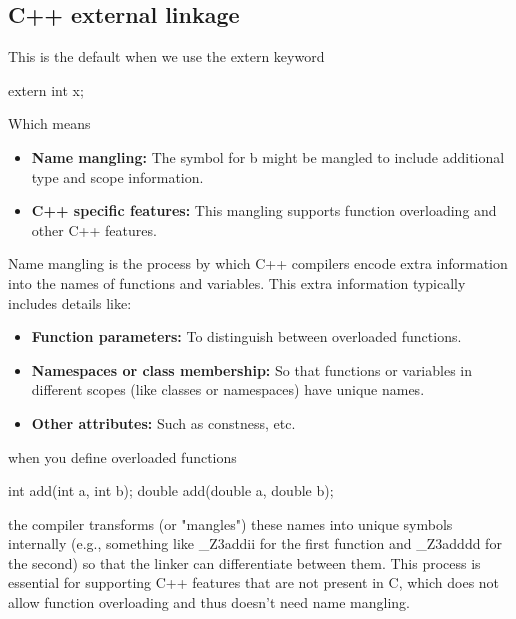 \documentclass{report}
\begin{document}
\pagebreak 
{}
\bigbreak \noindent 
\subsection{C++ external linkage}
\bigbreak \noindent 
This is the default when we use the extern keyword
\bigbreak \noindent 
\begin{cppcode}
extern int x;
\end{cppcode}
\bigbreak \noindent 
Which means
\begin{itemize}
    \item \textbf{Name mangling:} The symbol for b might be mangled to include additional type and scope information.
    \item \textbf{C++ specific features:} This mangling supports function overloading and other C++ features.
\end{itemize}
\bigbreak \noindent 
Name mangling is the process by which C++ compilers encode extra information into the names of functions and variables. This extra information typically includes details like:
\begin{itemize}
    \item \textbf{Function parameters:} To distinguish between overloaded functions.
    \item \textbf{Namespaces or class membership:} So that functions or variables in different scopes (like classes or namespaces) have unique names.
    \item \textbf{Other attributes:} Such as constness, etc.
\end{itemize}
\bigbreak \noindent 
when you define overloaded functions
\bigbreak \noindent 
\begin{cppcode}
int add(int a, int b);
double add(double a, double b);
\end{cppcode}
\bigbreak \noindent 
the compiler transforms (or "mangles") these names into unique symbols internally (e.g., something like \_Z3addii for the first function and \_Z3adddd for the second) so that the linker can differentiate between them. This process is essential for supporting C++ features that are not present in C, which does not allow function overloading and thus doesn't need name mangling.

\bigbreak \noindent 
\end{document}
